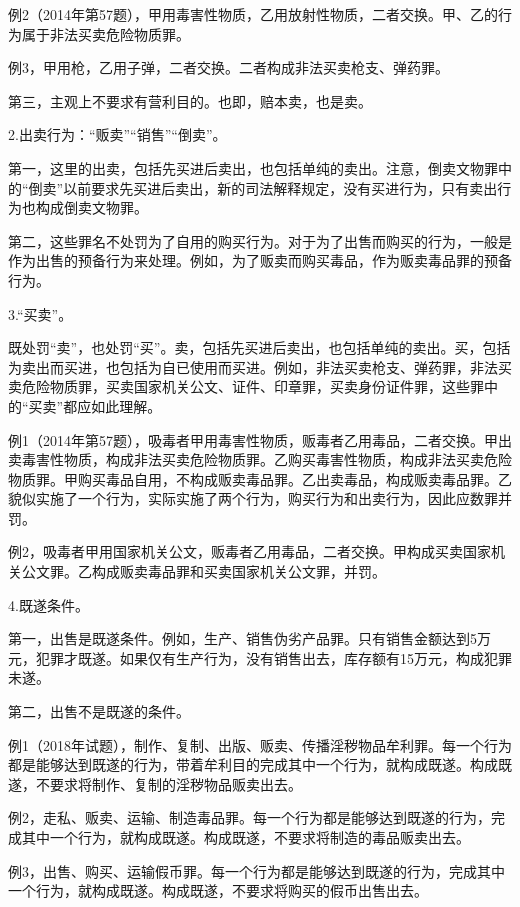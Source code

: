 例2（2014年第57题），甲用毒害性物质，乙用放射性物质，二者交换。甲、乙的行为属于非法买卖危险物质罪。

例3，甲用枪，乙用子弹，二者交换。二者构成非法买卖枪支、弹药罪。

第三，主观上不要求有营利目的。也即，赔本卖，也是卖。

2.出卖行为：“贩卖”“销售”“倒卖”。

第一，这里的出卖，包括先买进后卖出，也包括单纯的卖出。注意，倒卖文物罪中的“倒卖”以前要求先买进后卖出，新的司法解释规定，没有买进行为，只有卖出行为也构成倒卖文物罪。

第二，这些罪名不处罚为了自用的购买行为。对于为了出售而购买的行为，一般是作为出售的预备行为来处理。例如，为了贩卖而购买毒品，作为贩卖毒品罪的预备行为。

3.“买卖”。

既处罚“卖”，也处罚“买”。卖，包括先买进后卖出，也包括单纯的卖出。买，包括为卖出而买进，也包括为自已使用而买进。例如，非法买卖枪支、弹药罪，非法买卖危险物质罪，买卖国家机关公文、证件、印章罪，买卖身份证件罪，这些罪中的“买卖”都应如此理解。

例1（2014年第57题），吸毒者甲用毒害性物质，贩毒者乙用毒品，二者交换。甲出卖毒害性物质，构成非法买卖危险物质罪。乙购买毒害性物质，构成非法买卖危险物质罪。甲购买毒品自用，不构成贩卖毒品罪。乙出卖毒品，构成贩卖毒品罪。乙貌似实施了一个行为，实际实施了两个行为，购买行为和出卖行为，因此应数罪并罚。

例2，吸毒者甲用国家机关公文，贩毒者乙用毒品，二者交换。甲构成买卖国家机关公文罪。乙构成贩卖毒品罪和买卖国家机关公文罪，并罚。

4.既遂条件。

第一，出售是既遂条件。例如，生产、销售伪劣产品罪。只有销售金额达到5万元，犯罪才既遂。如果仅有生产行为，没有销售出去，库存额有15万元，构成犯罪未遂。

第二，出售不是既遂的条件。

例1（2018年试题），制作、复制、出版、贩卖、传播淫秽物品牟利罪。每一个行为都是能够达到既遂的行为，带着牟利目的完成其中一个行为，就构成既遂。构成既遂，不要求将制作、复制的淫秽物品贩卖出去。

例2，走私、贩卖、运输、制造毒品罪。每一个行为都是能够达到既遂的行为，完成其中一个行为，就构成既遂。构成既遂，不要求将制造的毒品贩卖出去。

例3，出售、购买、运输假币罪。每一个行为都是能够达到既遂的行为，完成其中一个行为，就构成既遂。构成既遂，不要求将购买的假币出售出去。
